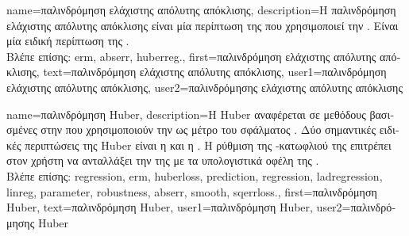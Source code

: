 {name={\foreignlanguage{greek}{παλινδρόμηση ελάχιστης απόλυτης απόκλισης}},
	description={\foreignlanguage{greek}{Η παλινδρόμηση ελά\-χιστης απόλυτης 
		απόκλισης} 
		\foreignlanguage{greek}{είναι μία περίπτωση της}  \foreignlanguage{greek}{που 
		χρησιμοποιεί την} . \foreignlanguage{greek}{Είναι μία ειδική περίπτωση της} 
		.\\
		\foreignlanguage{greek}{Βλέπε επίσης:} \gls{erm}, \gls{abserr}, \gls{huberreg}.},
	first={\foreignlanguage{greek}{παλινδρόμηση ελάχιστης απόλυτης απόκλισης}},
	text={\foreignlanguage{greek}{παλινδρόμηση ελάχιστης απόλυτης απόκλισης}},
	user1={\foreignlanguage{greek}{παλινδρόμηση ελάχιστης απόλυτης απόκλισης}}, %
	user2={\foreignlanguage{greek}{παλινδρόμησης ελάχιστης απόλυτης απόκλισης}} %
}

{name={\foreignlanguage{greek}{παλινδρόμηση} Huber},
	description={\foreignlanguage{greek}{Η}  Huber 
		\foreignlanguage{greek}{αναφέρεται σε μεθόδους βασισμένες στην}  
		\foreignlanguage{greek}{που χρησιμοποιούν την}  \foreignlanguage{greek}{ως μέτρο του σφάλματος} 
		. \foreignlanguage{greek}{Δύο σημαντικές ειδικές περιπτώσεις της}  Huber 
		\foreignlanguage{greek}{είναι η}  \foreignlanguage{greek}{και η} . 
		\foreignlanguage{greek}{Η ρύθμιση της} -\foreignlanguage{greek}{κατωφλιού 
		της}  \foreignlanguage{greek}{επιτρέπει στον χρήστη να ανταλλάξει την}  
		\foreignlanguage{greek}{της}  
		\foreignlanguage{greek}{με τα υπολογιστικά οφέλη της}  .\\
		\foreignlanguage{greek}{Βλέπε επίσης:} \gls{regression}, \gls{erm}, \gls{huberloss}, \gls{prediction}, \gls{regression}, \gls{ladregression}, 
		\gls{linreg}, \gls{parameter}, \gls{robustness}, \gls{abserr}, \gls{smooth}, \gls{sqerrloss}.},
	first={\foreignlanguage{greek}{παλινδρόμηση} Huber},
	text={\foreignlanguage{greek}{παλινδρόμηση} Huber},
	user1={\foreignlanguage{greek}{παλινδρόμηση} Huber}, %
	user2={\foreignlanguage{greek}{παλινδρόμησης} Huber} %
}

